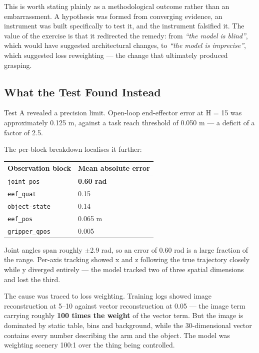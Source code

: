 \documentclass[12pt,a4paper,oneside]{report}
\begin{document}
This is worth stating plainly as a methodological outcome rather than an
embarrassment. A hypothesis was formed from converging evidence, an instrument
was built specifically to test it, and the instrument falsified it. The value of
the exercise is that it redirected the remedy: from \emph{``the model is blind''}, which
would have suggested architectural changes, to \emph{``the model is imprecise''}, which
suggested loss reweighting --- the change that ultimately produced grasping.

\hypertarget{what-the-test-found-instead}{%
\subsection{What the Test Found Instead}\label{what-the-test-found-instead}}

Test A revealed a precision limit. Open-loop end-effector error at H = 15 was
approximately 0.125 m, against a task reach threshold of 0.050 m --- a deficit of
a factor of 2.5.

The per-block breakdown localises it further:

\begin{longtable}[]{@{}ll@{}}
\toprule\noalign{}
Observation block & Mean absolute error \\
\midrule\noalign{}
\endhead
\bottomrule\noalign{}
\endlastfoot
\texttt{joint\_pos} & \textbf{0.60 rad} \\
\texttt{eef\_quat} & 0.15 \\
\texttt{object-state} & 0.14 \\
\texttt{eef\_pos} & 0.065 m \\
\texttt{gripper\_qpos} & 0.005 \\
\end{longtable}

Joint angles span roughly $\pm$2.9 rad, so an error of 0.60 rad is a large
fraction of the range. Per-axis tracking showed x and z following the true
trajectory closely while y diverged entirely --- the model tracked two of three
spatial dimensions and lost the third.

The cause was traced to loss weighting. Training logs showed image reconstruction
at 5--10 against vector reconstruction at 0.05 --- the image term carrying roughly
\textbf{100 times the weight} of the vector term. But the image is dominated by
static table, bins and background, while the 30-dimensional vector contains every
number describing the arm and the object. The model was weighting scenery
100:1 over the thing being controlled.
\end{document}
